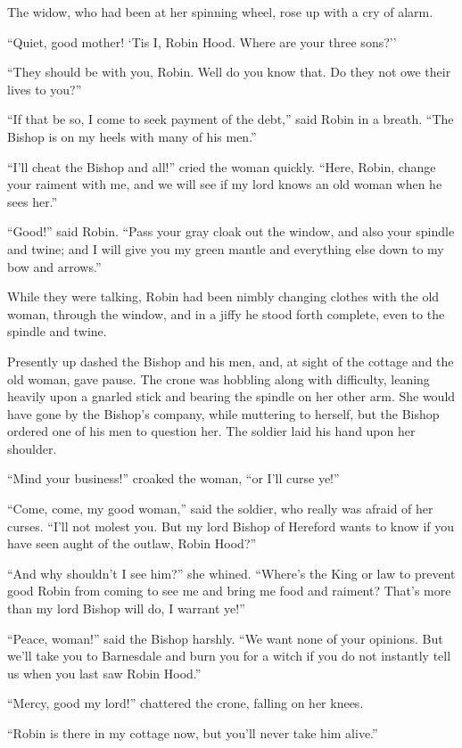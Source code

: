 The widow, who had been at her spinning wheel, rose up with a cry of
alarm.

``Quiet, good mother! `Tis I, Robin Hood. Where are your three sons?''

``They should be with you, Robin. Well do you know that. Do they not owe
their lives to you?''

``If that be so, I come to seek payment of the debt,'' said Robin in a
breath. ``The Bishop is on my heels with many of his men.''

``I'll cheat the Bishop and all!'' cried the woman quickly. ``Here,
Robin, change your raiment with me, and we will see if my lord knows an
old woman when he sees her.''

``Good!'' said Robin. ``Pass your gray cloak out the window, and also
your spindle and twine; and I will give you my green mantle and
everything else down to my bow and arrows.''

While they were talking, Robin had been nimbly changing clothes with the
old woman, through the window, and in a jiffy he stood forth complete,
even to the spindle and twine.

Presently up dashed the Bishop and his men, and, at sight of the cottage
and the old woman, gave pause. The crone was hobbling along with
difficulty, leaning heavily upon a gnarled stick and bearing the spindle
on her other arm. She would have gone by the Bishop's company, while
muttering to herself, but the Bishop ordered one of his men to question
her. The soldier laid his hand upon her shoulder.

``Mind your business!'' croaked the woman, ``or I'll curse ye!''

``Come, come, my good woman,'' said the soldier, who really was afraid
of her curses. ``I'll not molest you. But my lord Bishop of Hereford
wants to know if you have seen aught of the outlaw, Robin Hood?''

``And why shouldn't I see him?'' she whined. ``Where's the King or law
to prevent good Robin from coming to see me and bring me food and
raiment? That's more than my lord Bishop will do, I warrant ye!''

``Peace, woman!'' said the Bishop harshly. ``We want none of your
opinions. But we'll take you to Barnesdale and burn you for a witch if
you do not instantly tell us when you last saw Robin Hood.''

``Mercy, good my lord!'' chattered the crone, falling on her knees.

``Robin is there in my cottage now, but you'll never take him alive.''

